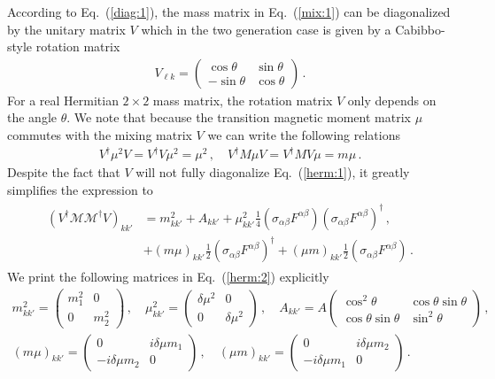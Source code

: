 \documentclass[addchapnum]{ws-rv961x669} %
\newcommand{\req}[1]{Eq.~(\ref{#1})}
\begin{document}
According to \req{diag:1}, the mass matrix in \req{mix:1} can be diagonalized by the unitary matrix $V$ which in the two generation case is given by a Cabibbo-style rotation matrix
\begin{align}
    \label{rot:1}
    V_{\ell k}=
    \begin{pmatrix}
        \cos\theta & \sin\theta\\
        -\sin\theta & \cos\theta
    \end{pmatrix}\,.
\end{align}
For a real Hermitian $2\times 2$ mass matrix, the rotation matrix $V$ only depends on the angle $\theta$. We note that because the transition magnetic moment matrix $\mu$ commutes with the mixing matrix $V$ we can write the following relations
\begin{align}
    V^{\dag}\mu^{2}V=V^{\dag}V\mu^{2}=\mu^{2}\,,\quad
    V^{\dag}M\mu V=V^{\dag}MV\mu=m\mu\,.
\end{align}
Despite the fact that $V$ will not fully diagonalize \req{herm:1}, it greatly simplifies the expression to
\begin{align}
    \begin{split}
    \label{herm:2}
    (V^{\dag}\mathcal{M}\mathcal{M}^{\dag}V)_{kk'}
    &=m_{kk'}^{2}+A_{kk'}+\mu^{2}_{kk'}\frac{1}{4}\left(\sigma_{\alpha\beta}F^{\alpha\beta}\right)\left(\sigma_{\alpha\beta}F^{\alpha\beta}\right)^{\dag}\,,\\
    &+(m\mu)_{kk'}\frac{1}{2}\left(\sigma_{\alpha\beta}F^{\alpha\beta}\right)^{\dag}
    +(\mu m)_{kk'}\frac{1}{2}\left(\sigma_{\alpha\beta}F^{\alpha\beta}\right)\,.
    \end{split}
\end{align}
We print the following matrices in \req{herm:2} explicitly
\begin{align}
    \label{herm:3}
    m_{kk'}^{2}\!=\!
    \begin{pmatrix}
        m_{1}^{2} & 0\\
        0 & m_{2}^{2}
    \end{pmatrix}\,,\quad
    \mu^{2}_{kk'}\!=\!
    \begin{pmatrix}
        \delta\mu^{2} & 0\\
        0 & \delta\mu^{2}
    \end{pmatrix}\,,\quad
    A_{kk'}\!=\!A
    \begin{pmatrix}
        \cos^{2}\theta & \cos\theta\sin\theta\\
        \cos\theta\sin\theta & \sin^{2}\theta
    \end{pmatrix}\,,\\
    (m\mu)_{kk'}=
    \begin{pmatrix}
        0 & i\delta\mu m_{1}\\
        -i\delta\mu m_{2} & 0
    \end{pmatrix}\,,\quad
    (\mu m)_{kk'}=
    \begin{pmatrix}
        0 & i\delta\mu m_{2}\\
        -i\delta\mu m_{1} & 0
    \end{pmatrix}\,.    
\end{align}
\end{document}

